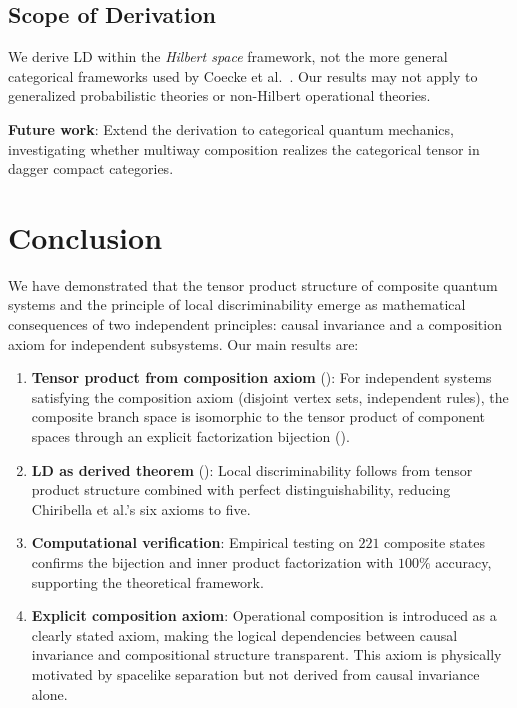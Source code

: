 \documentclass[11pt,a4paper]{article}
\theoremstyle{definition}
\theoremstyle{remark}
\begin{document}
\subsection{Scope of Derivation}

We derive LD within the \textit{Hilbert space} framework, not the more
general categorical frameworks used by Coecke et al.\
\cite{coecke2010quantum}. Our results may not apply to generalized
probabilistic theories or non-Hilbert operational theories.

\textbf{Future work}: Extend the derivation to categorical quantum
mechanics, investigating whether multiway composition realizes the
categorical tensor in dagger compact categories.

\section{Conclusion}
\label{sec:conclusion}

We have demonstrated that the tensor product structure of composite quantum systems and the principle of local discriminability emerge as mathematical consequences of two independent principles: causal invariance and a composition axiom for independent subsystems. Our main results are:

\begin{enumerate}
\item \textbf{Tensor product from composition axiom} (): For independent systems satisfying the composition axiom (disjoint vertex sets, independent rules), the composite branch space is isomorphic to the tensor product of component spaces through an explicit factorization bijection ().

\item \textbf{LD as derived theorem} (): Local discriminability follows from tensor product structure combined with perfect distinguishability, reducing Chiribella et al.'s six axioms to five.

\item \textbf{Computational verification}: Empirical testing on $221$ composite states confirms the bijection and inner product factorization with $100\%$ accuracy, supporting the theoretical framework.

\item \textbf{Explicit composition axiom}: Operational composition is introduced as a clearly stated axiom, making the logical dependencies between causal invariance and compositional structure transparent. This axiom is physically motivated by spacelike separation but not derived from causal invariance alone.
\end{enumerate}
\end{document}
